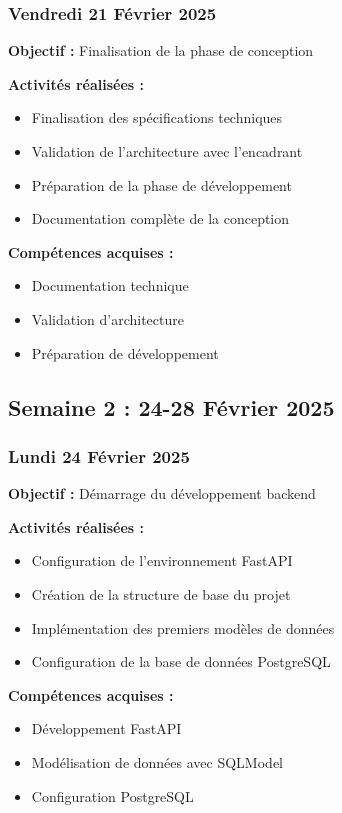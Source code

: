 \documentclass[12pt,a4paper]{article}
\begin{document}
\subsubsection{Vendredi 21 Février 2025}
\textbf{Objectif :} Finalisation de la phase de conception

\textbf{Activités réalisées :}
\begin{itemize}
    \item Finalisation des spécifications techniques
    \item Validation de l'architecture avec l'encadrant
    \item Préparation de la phase de développement
    \item Documentation complète de la conception
\end{itemize}

\textbf{Compétences acquises :}
\begin{itemize}
    \item Documentation technique
    \item Validation d'architecture
    \item Préparation de développement
\end{itemize}


\subsection{Semaine 2 : 24-28 Février 2025}

\subsubsection{Lundi 24 Février 2025}
\textbf{Objectif :} Démarrage du développement backend

\textbf{Activités réalisées :}
\begin{itemize}
    \item Configuration de l'environnement FastAPI
    \item Création de la structure de base du projet
    \item Implémentation des premiers modèles de données
    \item Configuration de la base de données PostgreSQL
\end{itemize}

\textbf{Compétences acquises :}
\begin{itemize}
    \item Développement FastAPI
    \item Modélisation de données avec SQLModel
    \item Configuration PostgreSQL
\end{itemize}
\end{document}

